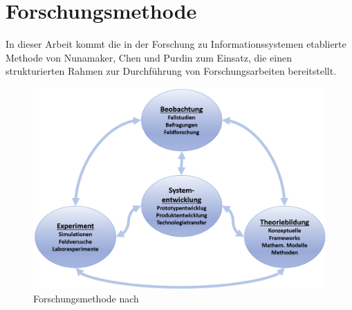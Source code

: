 \chapter{Forschungsmethode}


In dieser Arbeit kommt die in der Forschung zu Informationssystemen etablierte Methode von Nunamaker, Chen und Purdin \cite{nunamaker_systems_1990-1} zum Einsatz, die einen strukturierten Rahmen zur Durchführung von Forschungsarbeiten bereitstellt.

\begin{figure}[h]
    \centering
    \includegraphics[width=\textwidth]{pictures/Nunamaker2.png}
    \caption{Forschungsmethode nach \cite{nunamaker_systems_1990-1}}
    \label{fig:nunamaker}
\end{figure}

